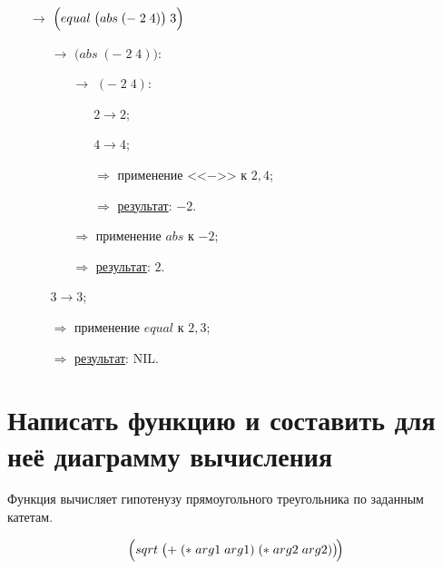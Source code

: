 \begin{itemize}
	\item[$\longrightarrow$] $\Bigl(equal\; \bigl(abs\; (-\; 2\; 4)\bigr)\; 3\Bigr)$
	\begin{itemize}
		\item[$\longrightarrow$] $\bigl(abs\; (-\; 2\; 4)\bigr)$:
		\begin{itemize}
			\item[$\longrightarrow$] $(-\; 2\; 4)$:
			\begin{itemize}
				\item[\textbullet] $2 \to 2$;
				\item[\textbullet] $4 \to 4$;
				\item[$\Longrightarrow$] применение <<$-$>> к $2, 4$;
				\item[$\Longrightarrow$] \underline{результат}: $-2$.
			\end{itemize}
			\item[$\Longrightarrow$] применение $abs$ к $-2$;
			\item[$\Longrightarrow$] \underline{результат}: $2$.
		\end{itemize}
		\item[\textbullet] $3 \to 3$;
		\item[$\Longrightarrow$] применение $equal$ к $2, 3$;
		\item[$\Longrightarrow$] \underline{результат}: NIL.
	\end{itemize}
\end{itemize}
\vfill



\section{Написать функцию и составить для неё диаграмму вычисления}

\problem Функция вычисляет гипотенузу прямоугольного треугольника по заданным катетам.
\vfill

\vfill

\[
	\Bigl(sqrt\; \bigl(+\; (*\; arg1\; arg1)\; (*\; arg2\; arg2)\bigr)\!\Bigr)
\]
\vfill


